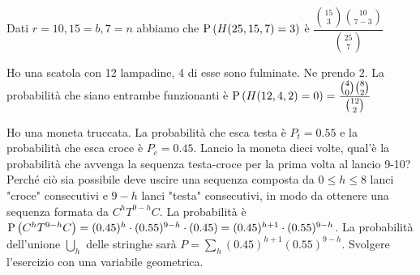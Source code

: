 \begin{exrc}
	\item Dati $ r = 10, 15 = b, 7 = n $ abbiamo che $ \text{P}\left(H(25,15,7) = 3\right) $ è $ \dfrac{\binom{15}{3}\binom{10}{7-3}}{\binom{25}{7}} $
	
	\item Ho una scatola con 12 lampadine, 4 di esse sono fulminate. Ne prendo 2. La probabilità che siano entrambe funzionanti è $ \text{P}\left(H(12, 4, 2) = 0\right) = \dfrac{\binom{4}{0}\binom{8}{2}}{\binom{12}{2}} $
	
	\item Ho una moneta truccata. La probabilità che esca testa è $ P_t = 0.55 $ e la probabilità che esca croce è $ P_c = 0.45 $. Lancio la moneta dieci volte, qual'è la probabilità che avvenga la sequenza testa-croce per la prima volta al lancio 9-10? Perché ciò sia possibile deve uscire una sequenza composta da $ 0 \leq h \leq 8 $ lanci "croce" consecutivi e $ 9-h $ lanci "testa" consecutivi, in modo da ottenere una sequenza formata da $ C^hT^{9-h}C $. La probabilità è $ \text{P}\left(C^hT^{9-h}C\right) = (0.45)^h \cdot (0.55)^{9-h} \cdot (0.45) = (0.45)^{h+1} \cdot (0.55)^{9-h}$. La probabilità dell'unione $ \bigcup_{h} $ delle stringhe sarà $ P = \sum_{h}(0.45)^{h+1}(0.55)^{9-h}$. Svolgere l'esercizio con una variabile geometrica.
	
\end{exrc}

